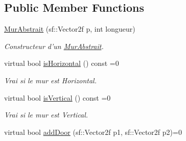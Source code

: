 \subsection*{Public Member Functions}
\begin{DoxyCompactItemize}
\item 
\hyperlink{classMurAbstrait_af87cbfbc13bc72eabfb5bb40b5fb186e}{Mur\-Abstrait} (sf\-::\-Vector2f p, int longueur)
\begin{DoxyCompactList}\small\item\em Constructeur d'un \hyperlink{classMurAbstrait}{Mur\-Abstrait}. \end{DoxyCompactList}\item 
\hypertarget{classMurAbstrait_ac6d6c50b6d935bf6f322428c76c650bf}{virtual bool \hyperlink{classMurAbstrait_ac6d6c50b6d935bf6f322428c76c650bf}{is\-Horizontal} () const =0}\label{classMurAbstrait_ac6d6c50b6d935bf6f322428c76c650bf}

\begin{DoxyCompactList}\small\item\em Vrai si le mur est Horizontal. \end{DoxyCompactList}\item 
\hypertarget{classMurAbstrait_aeb0dc942a444fa8637839a715d49068a}{virtual bool \hyperlink{classMurAbstrait_aeb0dc942a444fa8637839a715d49068a}{is\-Vertical} () const =0}\label{classMurAbstrait_aeb0dc942a444fa8637839a715d49068a}

\begin{DoxyCompactList}\small\item\em Vrai si le mur est Vertical. \end{DoxyCompactList}\item 
\hypertarget{classMurAbstrait_a179d1afa63b9ba817ad2feaa6441672b}{virtual bool \hyperlink{classMurAbstrait_a179d1afa63b9ba817ad2feaa6441672b}{add\-Door} (sf\-::\-Vector2f p1, sf\-::\-Vector2f p2)=0}\label{classMurAbstrait_a179d1afa63b9ba817ad2feaa6441672b}


\end{DoxyCompactItemize}
